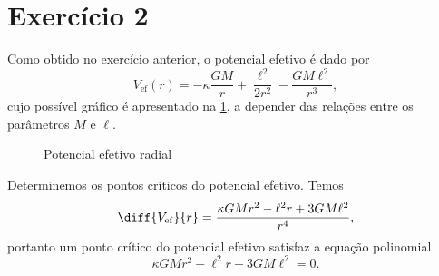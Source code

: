 \section*{Exercício 2}
Como obtido no exercício anterior, o potencial efetivo é dado por
\begin{equation*}
    V_\mathrm{ef}(r) = - \kappa \frac{GM}{r} + \frac{\ell^2}{2r^2} - \frac{GM\ell^2}{r^3},
\end{equation*}
cujo possível gráfico é apresentado na \cref{fig:exercício2}, a depender das relações entre os parâmetros \(M\) e \(\ell\).

\begin{figure}[ht]
    \centering
    \caption{Potencial efetivo radial}
    \label{fig:exercício2}
\end{figure}

Determinemos os pontos críticos do potencial efetivo. Temos
\begin{equation*}
    \diff{V_\mathrm{ef}}{r} = \frac{\kappa GM r^2 - \ell^2 r + 3 GM\ell^2}{r^4},
\end{equation*}
portanto um ponto crítico do potencial efetivo satisfaz a equação polinomial
\begin{equation*}
    \kappa GM r^2 - \ell^2r + 3 GM\ell^2 = 0.
\end{equation*}


